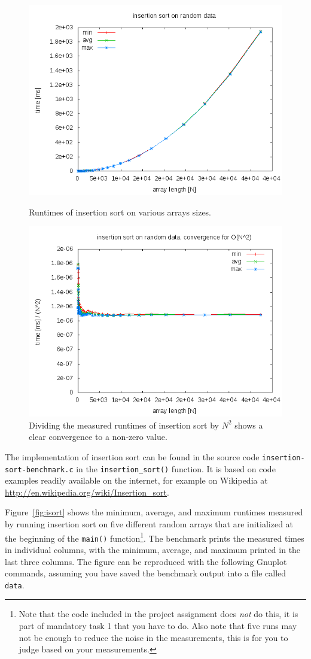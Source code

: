 \documentclass[a4paper,10pt]{article}
\begin{document}
\begin{figure}
  \centering
  \includegraphics[width=0.7\columnwidth]{examples/isort.png}
  \caption{
    Runtimes of insertion sort on various arrays sizes.
  }\label{fig:isort}
  \vspace{\baselineskip}
  \includegraphics[width=0.7\columnwidth]{examples/isort-N2.png}
  \caption{
    Dividing the measured runtimes of insertion sort by $N^2$ shows a clear convergence to a non-zero value.
  }\label{fig:isort-N2}
\end{figure}

The implementation of insertion sort can be found in the source code \texttt{insertion\--sort\--benchmark.c} in the \texttt{insertion\_sort()} function.
It is based on code examples readily available on the internet, for example on Wikipedia at \url{http://en.wikipedia.org/wiki/Insertion_sort}.

Figure~\ref{fig:isort} shows the minimum, average, and maximum runtimes measured by running insertion sort on five different random arrays that are initialized at the beginning of the \texttt{main()} function\footnote{
  Note that the code included in the project assignment does \emph{not} do this, it is part of mandatory task 1 that you have to do.
  Also note that five runs may not be enough to reduce the noise in the measurements, this is for you to judge based on your measurements.
}.
The benchmark prints the measured times in individual columns, with the minimum, average, and maximum printed in the last three columns.
The figure can be reproduced with the following Gnuplot commands, assuming you have saved the benchmark output into a file called \texttt{data}.
\end{document}
